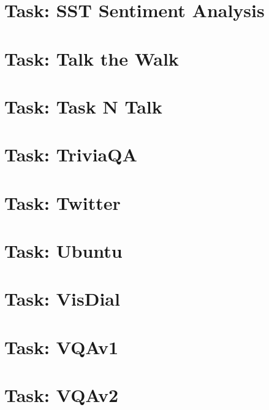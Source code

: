 \documentclass[twoside]{book}
\newcommand{\+}{\discretionary{\mbox{\scriptsize$\hookleftarrow$}}{}{}}
\begin{document}
\chapter{Task\+: S\+ST Sentiment Analysis}
\label{md_parlai_tasks_sst_README}

\chapter{Task\+: Talk the Walk}
\label{md_parlai_tasks_talkthewalk_README}

\chapter{Task\+: Task N\textquotesingle{} Talk}
\label{md_parlai_tasks_taskntalk_README}

\chapter{Task\+: Trivia\+QA}
\label{md_parlai_tasks_triviaqa_README}

\chapter{Task\+: Twitter}
\label{md_parlai_tasks_twitter_README}

\chapter{Task\+: Ubuntu}
\label{md_parlai_tasks_ubuntu_README}

\chapter{Task\+: Vis\+Dial}
\label{md_parlai_tasks_visdial_README}

\chapter{Task\+: V\+Q\+Av1}
\label{md_parlai_tasks_vqa_v1_README}

\chapter{Task\+: V\+Q\+Av2}
\label{md_parlai_tasks_vqa_v2_README}

\end{document}
